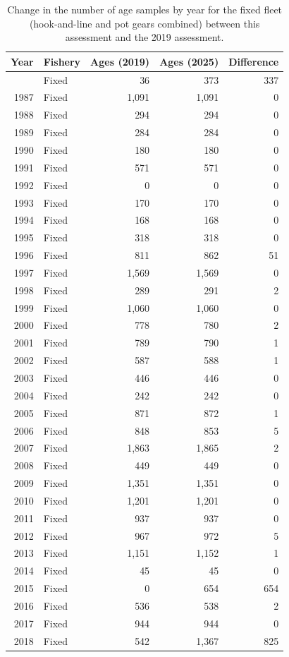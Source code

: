 \documentclass[
  english,
]{article}
\begin{document}
\begin{longtable}{rlrrr}

\caption{\label{tbl-fixed-age-samples-comp}Change in the number of age
samples by year for the fixed fleet (hook-and-line and pot gears
combined) between this assessment and the 2019 assessment.}

\tabularnewline

\toprule
Year & Fishery & Ages (2019) & Ages (2025) & Difference \\ 
\midrule\addlinespace[2.5pt]
1986 & Fixed & 36 & 373 & 337 \\ 
1987 & Fixed & 1,091 & 1,091 & 0 \\ 
1988 & Fixed & 294 & 294 & 0 \\ 
1989 & Fixed & 284 & 284 & 0 \\ 
1990 & Fixed & 180 & 180 & 0 \\ 
1991 & Fixed & 571 & 571 & 0 \\ 
1992 & Fixed & 0 & 0 & 0 \\ 
1993 & Fixed & 170 & 170 & 0 \\ 
1994 & Fixed & 168 & 168 & 0 \\ 
1995 & Fixed & 318 & 318 & 0 \\ 
1996 & Fixed & 811 & 862 & 51 \\ 
1997 & Fixed & 1,569 & 1,569 & 0 \\ 
1998 & Fixed & 289 & 291 & 2 \\ 
1999 & Fixed & 1,060 & 1,060 & 0 \\ 
2000 & Fixed & 778 & 780 & 2 \\ 
2001 & Fixed & 789 & 790 & 1 \\ 
2002 & Fixed & 587 & 588 & 1 \\ 
2003 & Fixed & 446 & 446 & 0 \\ 
2004 & Fixed & 242 & 242 & 0 \\ 
2005 & Fixed & 871 & 872 & 1 \\ 
2006 & Fixed & 848 & 853 & 5 \\ 
2007 & Fixed & 1,863 & 1,865 & 2 \\ 
2008 & Fixed & 449 & 449 & 0 \\ 
2009 & Fixed & 1,351 & 1,351 & 0 \\ 
2010 & Fixed & 1,201 & 1,201 & 0 \\ 
2011 & Fixed & 937 & 937 & 0 \\ 
2012 & Fixed & 967 & 972 & 5 \\ 
2013 & Fixed & 1,151 & 1,152 & 1 \\ 
2014 & Fixed & 45 & 45 & 0 \\ 
2015 & Fixed & 0 & 654 & 654 \\ 
2016 & Fixed & 536 & 538 & 2 \\ 
2017 & Fixed & 944 & 944 & 0 \\ 
2018 & Fixed & 542 & 1,367 & 825 \\ 
\bottomrule

\end{longtable}
\end{document}
